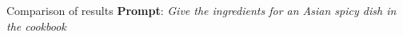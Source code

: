 \documentclass[10pt, t]{beamer}
\begin{document}
    \begin{frame}{Comparison of results}
        \textbf{Prompt}: \textit{Give the ingredients for an Asian spicy dish in the cookbook}
        \begin{figure}
        \end{figure}
    \end{frame}

\end{document}
